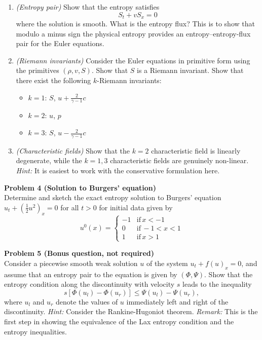 \documentclass[letter,11pt]{article}
\begin{document}
\begin{enumerate}
  \item \emph{(Entropy pair)} Show that the entropy satisfies
  \begin{equation}
    S_t + v S_x = 0
  \end{equation}
  where the solution is smooth. What is the entropy flux? This is to show that modulo a minus sign the physical entropy provides an entropy--entropy-flux pair for the Euler equations.

  \item \emph{(Riemann invariants)} Consider the Euler equations in primitive form using the primitives $(\rho,v,S)$. Show that $S$ is a Riemann invariant. Show that there exist the following $k$-Riemann invariants:
  \begin{itemize}
    \item $k = 1$: $S$, $u+ \frac{2}{\gamma - 1}c$
    \item $k = 2$: $u$, $p$
    \item $k = 3$: $S$, $u- \frac{2}{\gamma - 1}c$
  \end{itemize}

  \item \emph{(Characteristic fields)} Show that the $k=2$ characteristic field is linearly degenerate, while the $k=1,3$ characteristic fields are genuinely non-linear. \emph{Hint:} It is easiest to work with the conservative formulation here.

\end{enumerate}

\vspace{1cm}

{\noindent\large\textbf{Problem 4 (Solution to Burgers' equation)}}\\

\noindent Determine and sketch the exact entropy solution to Burgers' equation $u_t + (\frac{1}{2}u^2)_x = 0$ for all $t>0$ for initial data given by
\begin{equation}
  u^0(x) = \left\{ \begin{array}{ll}
  -1 & \mathrm{if}\, x<-1 \\
  0 & \mathrm{if}\, -1<x<1 \\
  1 & \mathrm{if}\, x>1
  \end{array}\right.
\end{equation}

\vspace{1cm}

{\noindent\large\textbf{Problem 5 (Bonus question, not required)}}\\

\noindent Consider a piecewise smooth weak solution $u$ of the system $u_t + f(u)_x = 0$, and assume that an entropy pair to the equation is given by $(\Phi,\Psi)$. Show that the entropy condition along the discontinuity with velocity $s$ leads to the inequality
\begin{equation}
  s[\Phi(u_l) - \Phi(u_r)] \le \Psi(u_l) - \Psi(u_r),
\end{equation}
where $u_l$ and $u_r$ denote the values of $u$ immediately left and right of the discontinuity.
\emph{Hint:} Consider the Rankine-Hugoniot theorem.
\emph{Remark:} This is the first step in showing the equivalence of the Lax entropy condition and the entropy inequalities.
\end{document}
